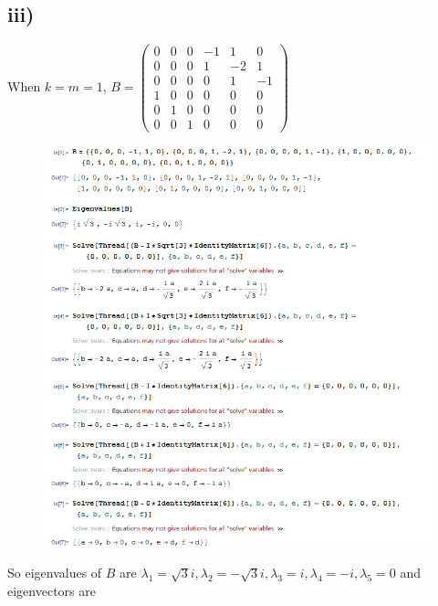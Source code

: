 \documentclass[a4paper,12pt,titlepage]{article}
\begin{document}
\subsection*{iii)}
When $k=m=1$, $B=\begin{pmatrix}
0&0&0&-1&1&0\\
0&0&0&1&-2&1\\
0&0&0&0&1&-1\\
1&0&0&0&0&0\\
0&1&0&0&0&0\\
0&0&1&0&0&0
\end{pmatrix}$
\begin{figure}[H]
    \centering
    \includegraphics[width=14cm]{2.png}
\end{figure}
So eigenvalues of $B$ are $\lambda_1=\sqrt{3}i,\lambda_2=-\sqrt{3}i,\lambda_3=i,\lambda_4=-i,\lambda_5=0$ and eigenvectors are
\end{document}
